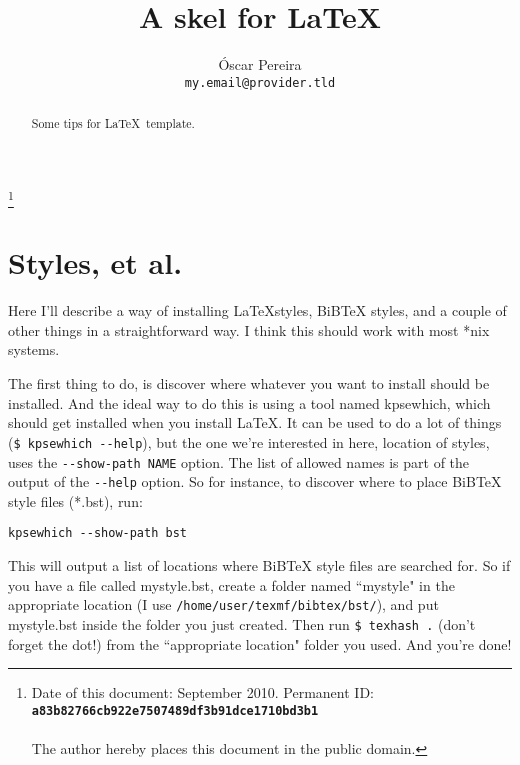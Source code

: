 \documentclass[a4paper,10pt,twocolumn]{article}
\title{\normalfont\Huge\textbf{A skel for \LaTeX}}
\author{Óscar Pereira\\\texttt{my.email@provider.tld}}
\date{}
\begin{document}
\maketitle              %


%
{\let\thefootnote\relax\footnote{Date of this document: September 2010. Permanent ID:
\mbox{\textbf{\texttt{a83b82766cb922e7507489df3b91dce1710bd3b1}}} \\ \\The
author hereby places this document in the public domain.}
\addtocounter{footnote}{-1}}

\begin{abstract}
	Some tips for \LaTeX\ template.
\end{abstract}

\section{Styles, et al.}
Here I’ll describe a way of installing \LaTeX styles, BiBTeX styles, and a couple 
of other things in a straightforward way. I think this should work with most 
*nix systems.

The first thing to do, is discover where whatever you want to install should be 
installed. And the ideal way to do this is using a tool named kpsewhich, which 
should get installed when you install LaTeX. It can be used to do a lot of 
things\\(\verb+$ kpsewhich --help+), but the one we’re interested in here, 
location of styles, uses the \verb+--show-path NAME+ option. The list of allowed names 
is part of the output of the \verb+--help+ option. So for instance, to discover where to place 
BiBTeX style files (*.bst), run:
\begin{verbatim}
kpsewhich --show-path bst
\end{verbatim}
This will output a list of locations where BiBTeX style files are searched for. 
So if you have a file called mystyle.bst, create a folder named ``mystyle" in the 
appropriate location (I use \verb+/home/user/texmf/bibtex/bst/+), and put mystyle.bst 
inside the folder you just created. Then run \verb+$ texhash .+ (don’t forget the 
dot!) from the ``appropriate location" folder you used. And you're done!
\end{document}

